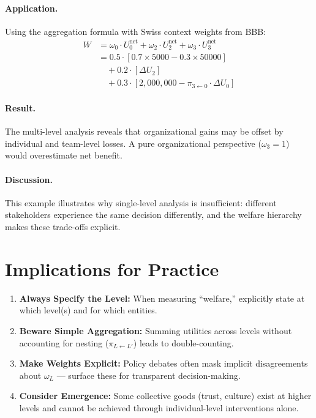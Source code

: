 \paragraph{Application.}
Using the aggregation formula with Swiss context weights from BBB:
\begin{align}
W &= \omega_0 \cdot U_0^{\text{net}} + \omega_2 \cdot U_2^{\text{net}} + \omega_3 \cdot U_3^{\text{net}} \\
  &= 0.5 \cdot [0.7 \times 5000 - 0.3 \times 50000] \\
  &\quad + 0.2 \cdot [\Delta U_2] \\
  &\quad + 0.3 \cdot [2,000,000 - \pi_{3 \leftarrow 0} \cdot \Delta U_0]
\end{align}

\paragraph{Result.}
The multi-level analysis reveals that organizational gains may be offset by
individual and team-level losses. A pure organizational perspective ($\omega_3 = 1$)
would overestimate net benefit.

\paragraph{Discussion.}
This example illustrates why single-level analysis is insufficient:
different stakeholders experience the same decision differently,
and the welfare hierarchy makes these trade-offs explicit.


\section{Implications for Practice}
\label{sec:who-practice}

\begin{tcolorbox}[colback=green!5!white, colframe=green!75!black,
    title=Practical Implications]
\begin{enumerate}
\item \textbf{Always Specify the Level:} When measuring ``welfare,'' explicitly state
      at which level(s) and for which entities.
\item \textbf{Beware Simple Aggregation:} Summing utilities across levels without
      accounting for nesting ($\pi_{L \leftarrow L'}$) leads to double-counting.
\item \textbf{Make Weights Explicit:} Policy debates often mask implicit disagreements
      about $\omega_L$ --- surface these for transparent decision-making.
\item \textbf{Consider Emergence:} Some collective goods (trust, culture) exist at higher
      levels and cannot be achieved through individual-level interventions alone.
\end{enumerate}
\end{tcolorbox}


